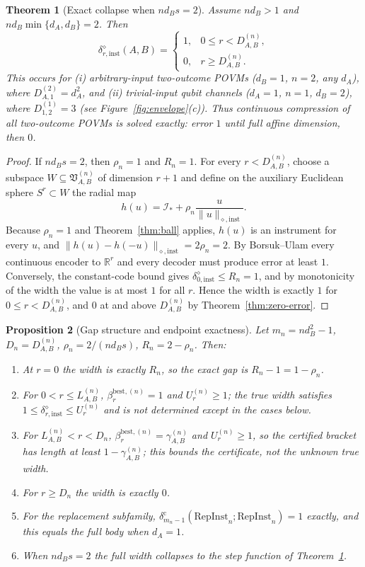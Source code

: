 \documentclass[11pt,a4paper]{article}
\newtheorem{theorem}{Theorem}[section]
\newtheorem{proposition}[theorem]{Proposition}
\newcommand{\RepInst}{\mathrm{RepInst}}
\begin{document}
\begin{theorem}[Exact collapse when $nd_Bs=2$]
\label{thm:collapse}
Assume $nd_B>1$ and $nd_B\min\{d_A,d_B\}=2$. Then
\[
\delta_{r,\mathrm{inst}}^{\diamond}(A,B)=
\begin{cases}
1,&0\le r<D_{A,B}^{(n)},\\
0,&r\ge D_{A,B}^{(n)}.
\end{cases}
\]
This occurs for (i) arbitrary-input two-outcome POVMs ($d_B=1$, $n=2$, any $d_A$), where $D_{A,1}^{(2)}=d_A^2$, and (ii) trivial-input qubit channels ($d_A=1$, $n=1$, $d_B=2$), where $D_{1,2}^{(1)}=3$ (see Figure~\ref{fig:envelope}(c)). Thus continuous compression of all two-outcome POVMs is solved exactly: error $1$ until full affine dimension, then $0$.
\end{theorem}

\begin{proof}
If $nd_Bs=2$, then $\rho_n=1$ and $R_n=1$. For every $r<D_{A,B}^{(n)}$, choose a subspace $W\subseteq\mathfrak V_{A,B}^{(n)}$ of dimension $r+1$ and define on the auxiliary Euclidean sphere $S^r\subset W$ the radial map
\[
h(u)=\mathcal I_*+\rho_n\frac{u}{\|u\|_{\diamond,\mathrm{inst}}}.
\]
Because $\rho_n=1$ and Theorem~\ref{thm:ball} applies, $h(u)$ is an instrument for every $u$, and $\|h(u)-h(-u)\|_{\diamond,\mathrm{inst}}=2\rho_n=2$. By Borsuk--Ulam every continuous encoder to $\mathbb R^r$ and every decoder must produce error at least $1$. Conversely, the constant-code bound gives $\delta_{0,\mathrm{inst}}^{\diamond}\le R_n=1$, and by monotonicity of the width the value is at most $1$ for all $r$. Hence the width is exactly $1$ for $0\le r<D_{A,B}^{(n)}$, and $0$ at and above $D_{A,B}^{(n)}$ by Theorem~\ref{thm:zero-error}.
\end{proof}

\begin{proposition}[Gap structure and endpoint exactness]
\label{prop:gap}
Let $m_n=nd_B^2-1$, $D_n=D_{A,B}^{(n)}$, $\rho_n=2/(nd_Bs)$, $R_n=2-\rho_n$. Then:
\begin{enumerate}[leftmargin=*,itemsep=2pt]
\item At $r=0$ the width is exactly $R_n$, so the exact gap is $R_n-1=1-\rho_n$.
\item For $0<r\le L_{A,B}^{(n)}$, $\beta_r^{\mathrm{best},(n)}=1$ and $U_r^{(n)}\ge1$; the true width satisfies $1\le\delta_{r,\mathrm{inst}}^{\diamond}\le U_r^{(n)}$ and is not determined except in the cases below.
\item For $L_{A,B}^{(n)}<r<D_n$, $\beta_r^{\mathrm{best},(n)}=\gamma_{A,B}^{(n)}$ and $U_r^{(n)}\ge1$, so the \emph{certified} bracket has length at least $1-\gamma_{A,B}^{(n)}$; this bounds the certificate, not the unknown true width.
\item For $r\ge D_n$ the width is exactly $0$.
\item For the replacement subfamily, $\delta_{m_n-1}^{\mathrm c}(\RepInst_n;\RepInst_n)=1$ exactly, and this equals the full body when $d_A=1$.
\item When $nd_Bs=2$ the full width collapses to the step function of Theorem~\ref{thm:collapse}.
\end{enumerate}
\end{proposition}
\end{document}
